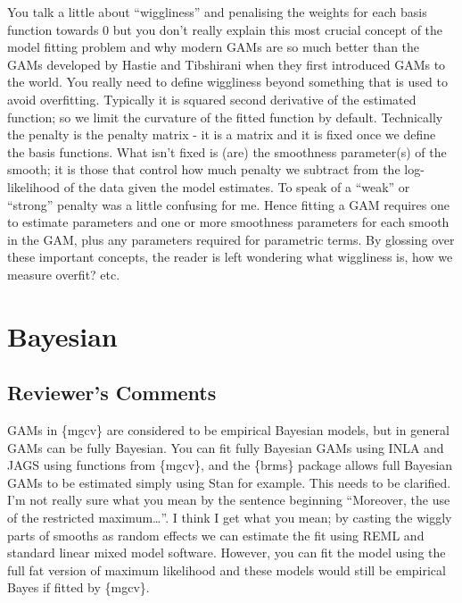 \documentclass[
]{article}
\begin{document}
You talk a little about ``wiggliness'' and penalising the weights for each basis function towards 0 but you don't really explain this most crucial concept of the model fitting problem and why modern GAMs are so much better than the
GAMs developed by Hastie and Tibshirani when they first introduced GAMs to the world.
You really need to define wiggliness beyond something that is used to avoid overfitting. Typically it is squared second derivative of the estimated function; so we limit the curvature of the fitted function by default. Technically the penalty is the penalty matrix - it is a matrix and it is fixed once we define the basis functions. What isn't fixed is (are) the smoothness parameter(s) of the smooth; it is those that control how much penalty we subtract from the log-likelihood of the data given the model estimates. To speak of a ``weak'' or ``strong'' penalty was a little confusing for me.
Hence fitting a GAM requires one to estimate parameters and one or more smoothness parameters for each smooth in the GAM, plus any parameters required for parametric terms.
By glossing over these important concepts, the reader is left wondering what wiggliness is, how we measure overfit? etc.

\hypertarget{bayesian}{%
\section{Bayesian}\label{bayesian}}

\hypertarget{reviewers-comments-5}{%
\subsection{Reviewer's Comments}\label{reviewers-comments-5}}

GAMs in \{mgcv\} are considered to be empirical Bayesian models, but in general GAMs can be fully Bayesian. You can fit fully Bayesian GAMs using INLA and JAGS using functions from \{mgcv\}, and the \{brms\} package allows full Bayesian GAMs to be estimated simply using Stan for example. This needs to be clarified.
I'm not really sure what you mean by the sentence beginning ``Moreover, the use of the restricted maximum\ldots{}''. I think I get what you mean; by casting the wiggly parts of smooths as random effects we can estimate the fit using REML
and standard linear mixed model software. However, you can fit the model using the full fat version of maximum likelihood and these models would still be empirical Bayes if fitted by \{mgcv\}.
\end{document}
